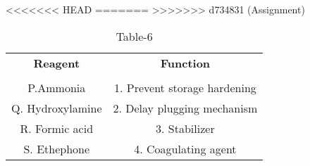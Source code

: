 \begin{table}[htbp]
  \centering
  \caption{Table-6}
<<<<<<< HEAD
  \label{tab:tables/table6.tex}
=======
  \label{table6}
>>>>>>> d734831 (Assignment)
  \begin{tabular}{cc}
  \textbf{Reagent} & \textbf{Function} \\ \\
    P.Ammonia  & 1. Prevent storage hardening \\
    Q. Hydroxylamine & 2. Delay plugging mechanism \\
    R. Formic acid & 3. Stabilizer \\
    S. Ethephone & 4. Coagulating agent \\
  \end{tabular}
\end{table}